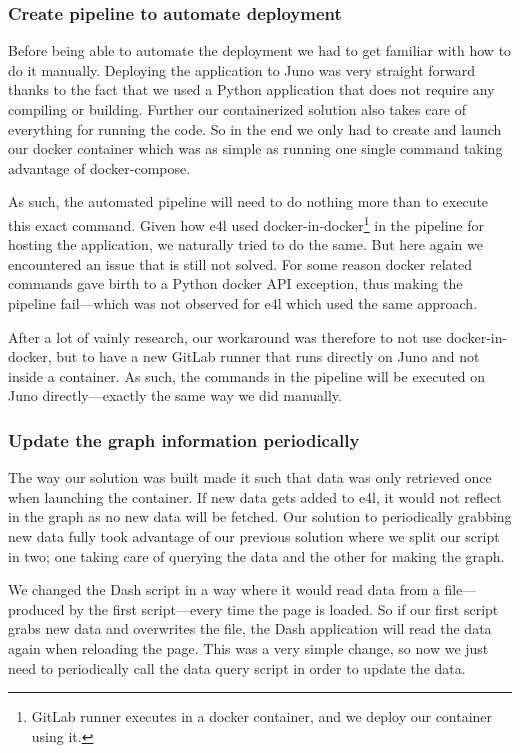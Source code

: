 \subsubsection{Create pipeline to automate deployment}

Before being able to automate the deployment we had to get familiar
with how to do it manually. Deploying the application to Juno was very
straight forward thanks to the fact that we used a Python application
that does not require any compiling or building. Further our
containerized solution also takes care of everything for running the
code. So in the end we only had to create and launch our docker
container which was as simple as running one single command taking
advantage of docker-compose.

As such, the automated pipeline will need to do nothing more than to
execute this exact command. Given how \gls{e4l} used
docker-in-docker\footnote{GitLab runner executes in a docker
container, and we deploy our container using it.} in the pipeline for
hosting the application, we naturally tried to do the same. But here
again we encountered an issue that is still not solved. For some
reason docker related commands gave birth to a Python docker API
exception, thus making the pipeline fail---which was not observed for
\gls{e4l} which used the same approach.

After a lot of vainly research, our workaround was therefore to not
use docker-in-docker, but to have a new GitLab runner that runs
directly on Juno and not inside a container. As such, the commands in
the pipeline will be executed on Juno directly---exactly the same way
we did manually.

\subsubsection{Update the graph information periodically}

The way our solution was built made it such that data was only
retrieved once when launching the container. If new data gets added to
\gls{e4l}, it would not reflect in the graph as no new data will be
fetched. Our solution to periodically grabbing new data fully took
advantage of our previous solution where we split our script in two;
one taking care of querying the data and the other for making the
graph.

We changed the Dash script in a way where it would read data from a
file---produced by the first script---every time the page is loaded.
So if our first script grabs new data and overwrites the file, the
Dash application will read the data again when reloading the page.
This was a very simple change, so now we just need to periodically
call the data query script in order to update the data.

